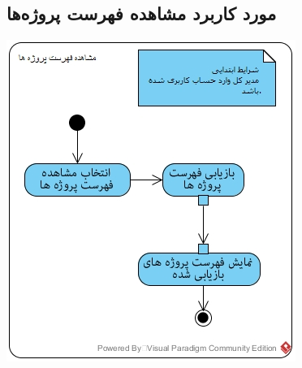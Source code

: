\documentclass{article}
\begin{document}
\subsection*{مورد کاربرد مشاهده فهرست پروژه‌ها}
\vspace{2cm}
\begin{center}
\includegraphics[width=\textwidth]{ActivityDiagrams/32.jpg}
\end{center}

\newpage
\vspace{2cm}
\end{document}
